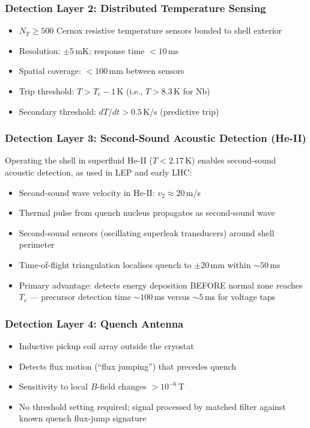 \documentclass[11pt,a4paper]{article}
\begin{document}
\subsubsection{Detection Layer 2: Distributed Temperature Sensing}

\begin{itemize}
  \item $N_T \geq 500$ Cernox resistive temperature sensors bonded
    to shell exterior
  \item Resolution: $\pm 5$\,mK; response time $< 10$\,ms
  \item Spatial coverage: $< 100$\,mm between sensors
  \item Trip threshold: $T > T_c - 1$\,K (i.e., $T > 8.3$\,K for Nb)
  \item Secondary threshold: $dT/dt > 0.5$\,K/s (predictive trip)
\end{itemize}

\subsubsection{Detection Layer 3: Second-Sound Acoustic Detection (He-II)}

Operating the shell in superfluid He-II ($T < 2.17$\,K) enables
second-sound acoustic detection, as used in LEP and early LHC:
\begin{itemize}
  \item Second-sound wave velocity in He-II: $v_2 \approx 20$\,m/s
  \item Thermal pulse from quench nucleus propagates as second-sound wave
  \item Second-sound sensors (oscillating superleak transducers) around
    shell perimeter
  \item Time-of-flight triangulation localises quench to $\pm 20$\,mm
    within $\sim 50$\,ms
  \item Primary advantage: detects energy deposition BEFORE
    normal zone reaches $T_c$ --- precursor detection time $\sim 100$\,ms
    versus $\sim 5$\,ms for voltage taps
\end{itemize}

\subsubsection{Detection Layer 4: Quench Antenna}

\begin{itemize}
  \item Inductive pickup coil array outside the cryostat
  \item Detects flux motion (``flux jumping'') that precedes quench
  \item Sensitivity to local $B$-field changes $> 10^{-6}$\,T
  \item No threshold setting required; signal processed by matched filter
    against known quench flux-jump signature
\end{itemize}
\end{document}
